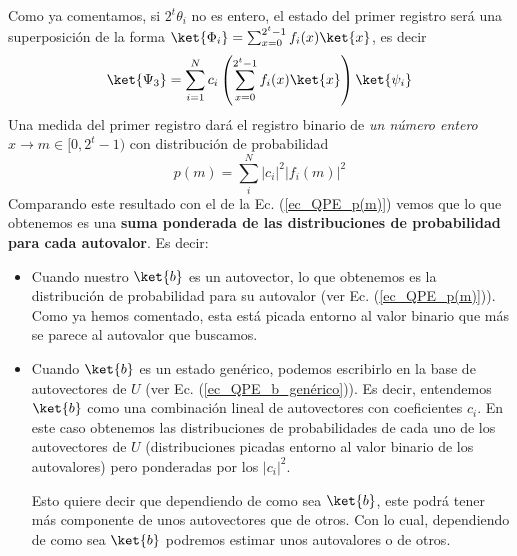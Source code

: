 \documentclass[a4paper,11pt]{book} %
\numberwithin{equation}{chapter}
\def\lp{\left(}
\def\rp{\right)}
\begin{document}
Como ya comentamos, si $2^t \theta_i$ no es entero, el estado del primer registro será una superposición de la forma $\ket{\Phi_i} = \sum_{x=0}^{2^t-1} f_i(x) \ket{x}$, es decir
	\begin{equation} \label{ec_QPE_Psi_3_ci}
	\ket{\Psi_3}  = \sum_{i=1}^N  c_i \lp \sum_{x=0}^{2^t-1} f_i(x) \ket{x} \rp  \ket{\psi_i} \\ \rule{0mm}{7mm}
	\end{equation}
Una medida del primer registro dará el registro binario de \textit{un número entero} $x \to m \in [0,2^t-1)$ con distribución de probabilidad 
	\begin{equation} \label{ec_QPE_p(m)_ci}
	p(m) = \sum_i^N |c_i|^2 |f_i(m)|^2
	\end{equation}		
Comparando este resultado con el de la Ec. (\ref{ec_QPE_p(m)}) vemos que lo que obtenemos es una \textbf{suma ponderada de las distribuciones de probabilidad para cada autovalor}. Es decir:
\begin{itemize}
	\item Cuando nuestro $\ket{b}$ es un autovector, lo que obtenemos es la distribución de probabilidad para su autovalor (ver Ec. (\ref{ec_QPE_p(m)})). Como ya hemos comentado, esta está picada entorno al valor binario que más se parece al autovalor que buscamos.
	
	\item Cuando $\ket{b}$ es un estado genérico, podemos escribirlo en la base de autovectores de $U$ (ver Ec. (\ref{ec_QPE_b_genérico})). Es decir, entendemos $\ket{b}$ como una combinación lineal de autovectores con coeficientes $c_i$. En este caso obtenemos las distribuciones de probabilidades de cada uno de los autovectores de $U$ (distribuciones picadas entorno al valor binario de los autovalores) pero ponderadas por los $|c_i|^2$. 
	
	Esto quiere decir que dependiendo de como sea $\ket{b}$, este podrá tener más componente de unos autovectores que de otros. Con lo cual, dependiendo de como sea $\ket{b}$ podremos estimar unos autovalores o de otros.
\end{itemize}
\end{document}
